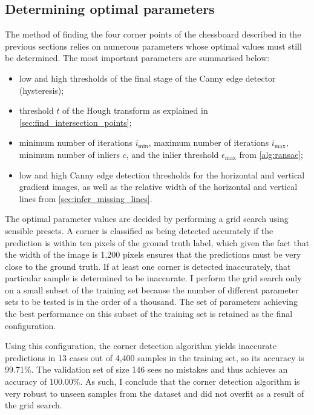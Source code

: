 \documentclass[../report.tex]{subfiles}
\begin{document}
\subsection{Determining optimal parameters}
\label{sec:determine_optimal_params}
The method of finding the four corner points of the chessboard described in the previous sections relies on numerous parameters whose optimal values must still be determined.
The most important parameters are summarised below:
\begin{itemize}
    \item low and high thresholds of the final stage of the Canny edge detector (hysteresis);
    \item threshold $t$ of the Hough transform as explained in \cref{sec:find_intersection_points};
    \item minimum number of iterations $i_\text{min}$, maximum number of iterations $i_\text{max}$, minimum number of inliers $c$, and the inlier threshold $\epsilon_\text{max}$ from \cref{alg:ransac};
    \item low and high Canny edge detection thresholds for the horizontal and vertical gradient images, as well as the relative width of the horizontal and vertical lines from \cref{sec:infer_missing_lines}.
\end{itemize}
The optimal parameter values are decided by performing a grid search using sensible presets.
A corner is classified as being detected accurately if the prediction is within ten pixels of the ground truth label, which given the fact that the width of the image is 1,200 pixels ensures that the predictions must be very close to the ground truth.
If at least one corner is detected inaccurately, that particular sample is determined to be inaccurate.
I perform the grid search only on a small subset of the training set because the number of different parameter sets to be tested is in the order of a thousand.
The set of parameters achieving the best performance on this subset of the training set is retained as the final configuration.

Using this configuration, the corner detection algorithm yields inaccurate predictions in 13 cases out of 4,400 samples in the training set, so its accuracy is 99.71\%.
The validation set of size 146 sees no mistakes and thus achieves an accuracy of 100.00\%.
As such, I conclude that the corner detection algorithm is very robust to unseen samples from the dataset and did not overfit as a result of the grid search.
\end{document}

